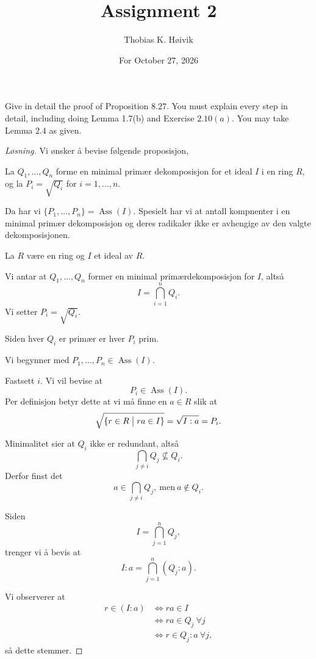 \documentclass[11pt]{article}
\title{Assignment 2}
\author{Thobias K. H\o ivik}
\date{For October 27, 2026} %
\DeclareMathOperator{\Ass}{\operatorname{Ass}}
\begin{document}
\maketitle
\begin{prob*}[1]
    Give in detail the proof of 
    Proposition $8.27$. You must 
    explain every step in detail, 
    including doing Lemma 1.7(b) and 
    Exercise $2.10(a)$. 
    You may take Lemma $2.4$ as given. 
\end{prob*}
\begin{proof}[L{\o}sning]
    Vi ønsker å bevise 
    f{\o}lgende proposisjon, 
    \begin{prop*}
        La $Q_1,\ldots,Q_n$ forme 
        en minimal prim{\ae}r 
        dekomposisjon for 
        et ideal $I$ i en ring $R$, 
        og la $P_i = \sqrt{Q_i}$ for 
        $i = 1,\ldots,n$. 

        Da har vi $\{P_1,\ldots,P_n\} 
        = \Ass(I)$. Spesielt har vi at 
        antall kompnenter i en minimal prim{\ae}r 
        dekomposisjon og deres radikaler 
        ikke er avhengige av den valgte dekomposisjonen. 
    \end{prop*}

    La $R$ v{\ae}re en ring og $I$ et ideal av 
    $R$. 

    Vi antar at $Q_1,\ldots,Q_n$ former en 
    minimal prim{\ae}rdekomposisjon for $I$,
    alts{\aa}
    \[
        I = \bigcap_{i=1}^n Q_i. 
    \]
    Vi setter $P_i = \sqrt{Q_i}$. 

    Siden hver $Q_i$ er prim{\ae}r er hver 
    $P_i$ prim.  
    
    Vi begynner med $P_1,\ldots,P_n \in \Ass(I)$. 

    Fastsett $i$. Vi vil bevise at 
    \[
        P_i \in \Ass(I). 
    \]
    Per definisjon betyr dette at vi m{\aa} finne 
    en $a \in R$ slik at 
    \[
        \sqrt{\{r \in R \bigm| ra \in I\}} 
        = \sqrt{I:a} = P_i. 
    \]

    Minimalitet sier at $Q_i$ ikke er redundant, alts{\aa}
    \[
        \bigcap_{j\neq i} Q_j \not\subseteq Q_i. 
    \]
    Derfor finst det 
    \[
        a \in \bigcap_{j\neq i} Q_j, \ \text{men} \ 
        a \not\in Q_i. 
    \] 

    Siden 
    \[
        I = \bigcap_{j=1}^n Q_j, 
    \]
    trenger vi å bevis at 
    \[
        I : a = \bigcap_{j=1}^n (Q_j : a). 
    \]
    
    Vi observerer at 
    \begin{align*}
        r \in (I : a) 
        &\Leftrightarrow ra \in I \\ 
        &\Leftrightarrow ra \in Q_j \ \forall j \\ 
        &\Leftrightarrow r \in Q_j : a \ \forall j, 
    \end{align*}
    så dette stemmer. 


\end{proof}
\end{document}
